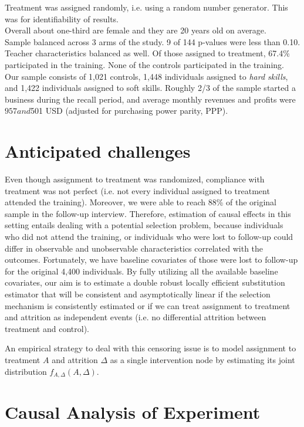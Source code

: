 \documentclass[oneside, notitlepage]{book}
\begin{document}
Treatment was assigned randomly, i.e. using a random number generator. This was for identifiability of results.\\

Overall about one-third are female and they are 20 years old on average.\\

Sample balanced across 3 arms of the study. 9 of 144 p-values were less than 0.10. Teacher characteristics balanced as well. Of those assigned to treatment, 67.4\% participated in the training. None of the controls participated in the training. Our sample consists of 1,021 controls, 1,448 individuals assigned to \textit{hard skills}, and 1,422 individuals assigned to soft skills. Roughly 2/3 of the sample started a business during the recall period, and average monthly revenues and profits were $957 and $501 USD (adjusted for purchasing power parity, PPP).\\


\section{Anticipated challenges}
\label{sec:antic-chall}

Even though assignment to treatment was randomized, compliance with treatment was not perfect (i.e. not every individual assigned to treatment attended the training). Moreover, we were able to reach 88\% of the original sample in the follow-up interview. Therefore, estimation of causal effects in this setting entails dealing with a potential selection problem, because individuals who did not attend the training, or individuals who were lost to follow-up could differ in observable and unobservable characteristics correlated with the outcomes. Fortunately, we have baseline covariates of those were lost to follow-up for the original 4,400 individuals. By fully utilizing all the available baseline covariates, our aim is to estimate a double robust locally efficient substitution estimator that will be consistent and asymptotically linear if the selection mechanism is consistently estimated or if we can treat assignment to treatment and attrition as independent events (i.e. no differential attrition between treatment and control).

An empirical strategy to deal with this censoring issue is to model assignment to treatment $A$ and attrition $\Delta$ as a single intervention node by estimating its joint distribution $f_{A,\Delta}(A,\Delta)$.


\section{Causal Analysis of Experiment}
\label{sec:caus-analys-exper}
\end{document}
